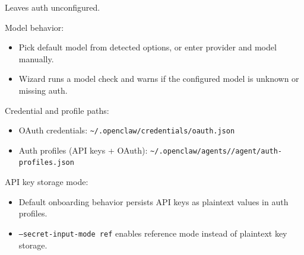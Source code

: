 Leaves auth unconfigured.

Model behavior:

\begin{itemize}
  \item Pick default model from detected options, or enter provider and model manually.
  \item Wizard runs a model check and warns if the configured model is unknown or missing auth.
\end{itemize}


Credential and profile paths:

\begin{itemize}
  \item OAuth credentials: \texttt{\textasciitilde{}/.openclaw/credentials/oauth.json}
  \item Auth profiles (API keys + OAuth): \texttt{\textasciitilde{}/.openclaw/agents//agent/auth-profiles.json}
\end{itemize}


API key storage mode:

\begin{itemize}
  \item Default onboarding behavior persists API keys as plaintext values in auth profiles.
  \item \texttt{--secret-input-mode ref} enables reference mode instead of plaintext key storage.
\end{itemize}

